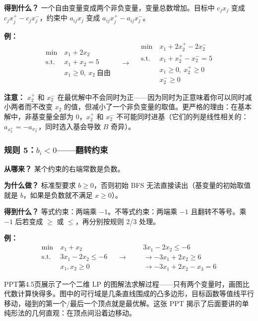 \textbf{得到什么？} 一个自由变量变成两个非负变量，变量总数增加。目标中 $c_j x_j$ 变成 $c_j x_j^+ - c_j x_j^-$，约束中 $a_{ij}x_j$ 变成 $a_{ij}x_j^+ - a_{ij}x_j^-$。

\textbf{例：}
\[
\begin{aligned}
\min\ & x_1 + 2x_2 \\
\text{s.t.}\ & x_1 + x_2 = 5 \\
& x_1 \ge 0,\ x_2\ \text{自由}
\end{aligned}
\quad\longrightarrow\quad
\begin{aligned}
\min\ & x_1 + 2x_2^+ - 2x_2^- \\
\text{s.t.}\ & x_1 + x_2^+ - x_2^- = 5 \\
& x_1 \ge 0,\ x_2^+ \ge 0 \\
& x_2^- \ge 0
\end{aligned}
\]

\textbf{注意：} $x_2^+$ 和 $x_2^-$ 在最优解中不会同时为正——因为同时为正意味着你可以同时减小两者而不改变 $x_2$ 的值，但减小了一个非负变量的取值。更严格的理由：在基本解中，非基变量全部为 0，$x_2^+$ 和 $x_2^-$ 不可能同时进基（它们的列是线性相关的：$a_{x_2^+} = -a_{x_2^-}$，同时选入基会导致 $B$ 奇异）。

\subsubsection{规则 5：$b_i < 0$——翻转约束}

\textbf{从哪来？} 某个约束的右端常数是负数。

\textbf{为什么做？} 标准型要求 $b\ge 0$，否则初始 BFS 无法直接读出（基变量的初始取值就是 $b$，如果是负数就不满足 $x\ge 0$）。

\textbf{得到什么？} 等式约束：两端乘 $-1$。不等式约束：两端乘 $-1$ 且翻转不等号。乘 $-1$ 后若变成 $\ge$ 或 $\le$，再分别按规则 2/3 处理。

\textbf{例：}
{\small
\[
\begin{aligned}
\min\ & x_1 + x_2 \\
\text{s.t.}\ & 3x_1 - 2x_2 \le -6 \\
& x_1, x_2 \ge 0
\end{aligned}
\quad\longrightarrow\quad
\begin{aligned}
& 3x_1 - 2x_2 \le -6 \\
&\to -3x_1 + 2x_2 \ge 6 \\
&\to -3x_1 + 2x_2 - x_3 = 6
\end{aligned}
\]
}

PPT第4.5页展示了一个二维 LP 的图解法求解过程——只有两个变量时，画图比代数计算快得多。图中的可行域是几条直线围成的凸多边形，目标函数等值线平行移动，碰到的第一个/最后一个顶点就是最优解。这张 PPT 揭示了后面要讲的单纯形法的几何直观：在顶点间沿着边移动。

